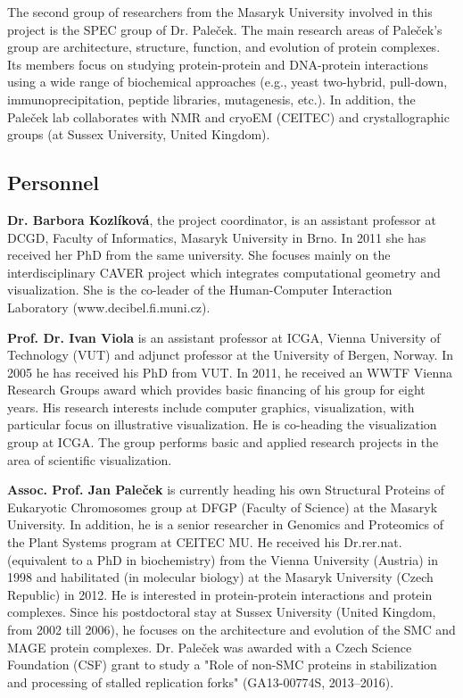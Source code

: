 \documentclass[11pt,a4paper,titlepage,oneside,onecolumn]{article}
\begin{document}
The second group of researchers from the Masaryk University involved in this project is the SPEC group of Dr. Pale\v{c}ek. 
The main research areas of Pale\v{c}ek's group are architecture, structure, function, and evolution of protein complexes.
Its members focus on studying protein-protein and DNA-protein interactions using a wide range of biochemical approaches (e.g., yeast two-hybrid, pull-down, immunoprecipitation, peptide libraries, mutagenesis, etc.). 
In addition, the Pale\v{c}ek lab collaborates with NMR and cryoEM (CEITEC) and crystallographic groups (at Sussex University, United Kingdom). 

\subsection{Personnel}
\vspace{-4mm}
\textbf{Dr. Barbora Kozl\'{i}kov\'{a}}, the project coordinator, is an assistant professor at DCGD, Faculty of Informatics, Masaryk University in Brno. In 2011 she has received her PhD from the same university. She focuses mainly on the interdisciplinary CAVER project which integrates computational geometry and visualization. She is the co-leader of the Human-Computer Interaction Laboratory (www.decibel.fi.muni.cz). 

\textbf{Prof. Dr. Ivan Viola} is an assistant professor at ICGA, Vienna University of Technology (VUT) and adjunct professor at the University of Bergen, Norway. In 2005 he has received his PhD from VUT. In 2011, he received an WWTF Vienna Research Groups award which provides basic financing of his group for eight years. His research interests include computer graphics, visualization, with particular focus on illustrative visualization. He is co-heading the visualization group at ICGA. The group performs basic and applied research projects in the area of scientific visualization. 

\textbf{Assoc. Prof. Jan Pale\v{c}ek} is currently heading his own Structural Proteins of Eukaryotic Chromosomes group at  DFGP (Faculty of Science) at the Masaryk University. 
In addition, he is a senior researcher in Genomics and Proteomics of the Plant Systems program at CEITEC MU. 
He received his Dr.rer.nat. (equivalent to a PhD in biochemistry) from the Vienna University (Austria) in 1998 and habilitated (in molecular biology) at the Masaryk University (Czech Republic) in 2012. 
He is interested in protein-protein interactions and protein complexes. 
Since his postdoctoral stay at Sussex University (United Kingdom, from 2002 till 2006), he focuses on the architecture and evolution of the SMC and MAGE protein complexes. 
Dr. Pale\v{c}ek was awarded with a Czech Science Foundation (CSF) grant to study a "Role of non-SMC proteins in stabilization and processing of stalled replication forks" (GA13-00774S, 2013--2016).
\end{document}
